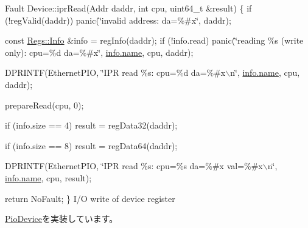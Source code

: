 Fault Device::iprRead(Addr daddr, int cpu, uint64\_\-t \&result) \{ if (!regValid(daddr)) panic(\char`\"{}invalid address: da=\%\#x\char`\"{}, daddr);

const \hyperlink{structSinic_1_1Regs_1_1Info}{Regs::Info} \&info = regInfo(daddr); if (!info.read) panic(\char`\"{}reading \%s (write only): cpu=\%d da=\%\#x\char`\"{}, \hyperlink{trace_8hh_a166fa10b86d8faa127fb7c78191e3e60}{info.name}, cpu, daddr);

DPRINTF(EthernetPIO, \char`\"{}IPR read \%s: cpu=\%d da=\%\#x$\backslash$n\char`\"{}, \hyperlink{trace_8hh_a166fa10b86d8faa127fb7c78191e3e60}{info.name}, cpu, daddr);

prepareRead(cpu, 0);

if (info.size == 4) result = regData32(daddr);

if (info.size == 8) result = regData64(daddr);

DPRINTF(EthernetPIO, \char`\"{}IPR read \%s: cpu=\%s da=\%\#x val=\%\#x$\backslash$n\char`\"{}, \hyperlink{trace_8hh_a166fa10b86d8faa127fb7c78191e3e60}{info.name}, cpu, result);

return NoFault; \} I/O write of device register 

\hyperlink{classPioDevice_afe8371668d023bb2516b286e5e399b6f}{PioDevice}を実装しています。



